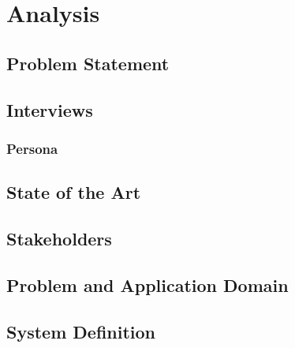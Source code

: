 \chapter{Analysis}


\section{Problem Statement}


\section{Interviews}



\subsection{Persona}


\section{State of the Art}


\section{Stakeholders}


\section{Problem and Application Domain}


\section{System Definition}

